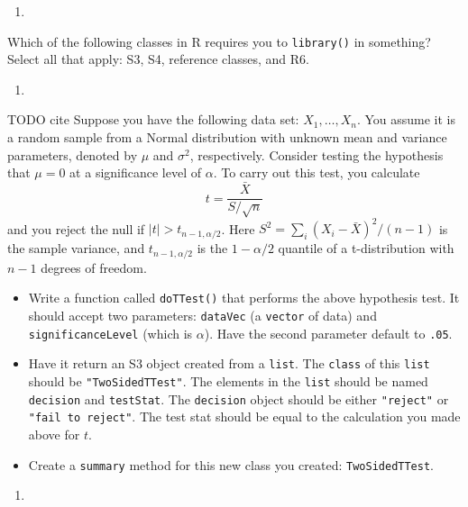 \documentclass[
  12pt,
  krantz2]{krantz}
\providecommand{\tightlist}{%
  \setlength{\itemsep}{0pt}\setlength{\parskip}{0pt}}
\begin{document}
\begin{enumerate}
\def\labelenumi{\arabic{enumi}.}
\setcounter{enumi}{7}
\tightlist
\item
\end{enumerate}

Which of the following classes in R requires you to \texttt{library()} in something? Select all that apply: S3, S4, reference classes, and R6.

\begin{enumerate}
\def\labelenumi{\arabic{enumi}.}
\setcounter{enumi}{8}
\tightlist
\item
\end{enumerate}

TODO cite
Suppose you have the following data set: \(X_1, \ldots, X_n\). You assume it is a random sample from a Normal distribution with unknown mean and variance parameters, denoted by \(\mu\) and \(\sigma^2\), respectively. Consider testing the hypothesis that \(\mu = 0\) at a significance level of \(\alpha\). To carry out this test, you calculate
\[
t = \frac{\bar{X}}{S/\sqrt{n}}
\]
and you reject the null if \(|t| > t_{n-1,\alpha/2}\). Here \(S^2 = \sum_i(X_i - \bar{X})^2 / (n-1)\) is the sample variance, and \(t_{n-1,\alpha/2}\) is the \(1-\alpha/2\) quantile of a t-distribution with \(n-1\) degrees of freedom.

\begin{itemize}
\tightlist
\item
  Write a function called \texttt{doTTest()} that performs the above hypothesis test. It should accept two parameters: \texttt{dataVec} (a \texttt{vector} of data) and \texttt{significanceLevel} (which is \(\alpha\)). Have the second parameter default to \texttt{.05}.
\item
  Have it return an S3 object created from a \texttt{list}. The \texttt{class} of this \texttt{list} should be \texttt{"TwoSidedTTest"}. The elements in the \texttt{list} should be named \texttt{decision} and \texttt{testStat}. The \texttt{decision} object should be either \texttt{"reject"} or \texttt{"fail\ to\ reject"}. The test stat should be equal to the calculation you made above for \(t\).
\item
  Create a \texttt{summary} method for this new class you created: \texttt{TwoSidedTTest}.
\end{itemize}

\begin{enumerate}
\def\labelenumi{\arabic{enumi}.}
\setcounter{enumi}{9}
\tightlist
\item
\end{enumerate}
\end{document}
